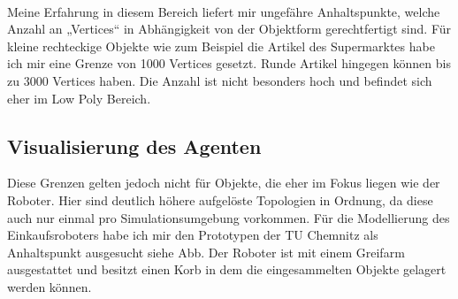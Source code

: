 \\
Meine Erfahrung in diesem Bereich liefert mir ungefähre Anhaltspunkte, welche Anzahl an „Vertices“ in Abhängigkeit von der Objektform gerechtfertigt sind. Für kleine rechteckige Objekte wie zum Beispiel die Artikel des Supermarktes habe ich mir eine Grenze von 1000 Vertices gesetzt. Runde Artikel hingegen können bis zu 3000 Vertices haben. Die Anzahl ist nicht besonders hoch und befindet sich eher im Low Poly Bereich.

\subsection{Visualisierung des Agenten}
\label{vis_agent}
Diese Grenzen gelten jedoch nicht für Objekte, die eher im Fokus liegen wie der Roboter. Hier sind deutlich höhere aufgelöste Topologien in Ordnung, da diese auch nur einmal pro Simulationsumgebung vorkommen. Für die Modellierung des Einkaufsroboters habe ich mir den Prototypen der TU Chemnitz als Anhaltspunkt ausgesucht siehe Abb. Der Roboter ist mit einem Greifarm ausgestattet und besitzt einen Korb in dem die eingesammelten Objekte gelagert werden können. 